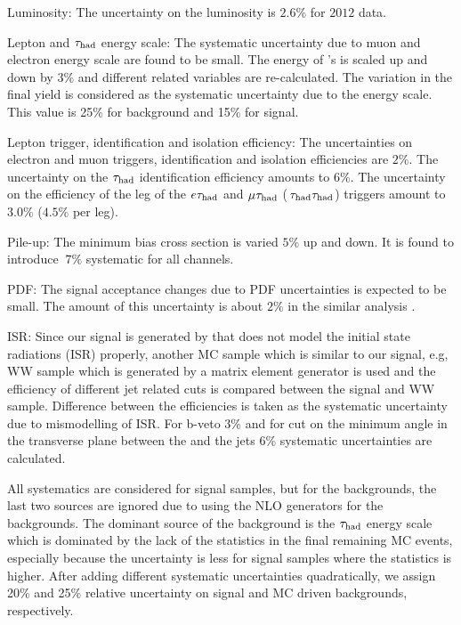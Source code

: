  Luminosity: The uncertainty on the luminosity  is $2.6\%$ for $2012$ data.
 
 Lepton and $\tau_{\rm had}$ energy scale: The systematic uncertainty due to muon and electron energy scale are found to be small.
The energy of \hadtau's is scaled up and down by $3\%$ and different \Tau related variables are re-calculated.  The variation in the final yield is considered as the
systematic uncertainty due to the \Tau energy scale. This value is 25\% for background and 15\% for signal.

 Lepton trigger, identification and isolation efficiency: The uncertainties on electron and muon triggers, identification and isolation efficiencies are $2\%$. 
The uncertainty on the $\tau_{\rm had}$ identification efficiency amounts to $6\%$. 
The uncertainty on the efficiency of the \Tau leg of the $e\tau_{\rm had}$ and $\mu\tau_{\rm had}$ ($\,\tau_{\rm had}\tau_{\rm had}$) triggers amount to $3.0\%$ ($4.5\%$ per leg).

 Pile-up: The minimum bias cross section is varied $5 \%$ up and down. It is found to introduce $~7 \%$ systematic for all channels.    

 PDF: The signal acceptance changes due to PDF uncertainties is expected to be small. 
The amount of this uncertainty is about $2\%$ in the similar analysis \cite{Khachatryan:2014qwa}.

ISR: Since our signal is generated by \PYTHIA that does not  model the initial state radiations (ISR) properly, another MC sample which is similar to our signal, e.g, WW sample 
which is generated by a matrix element generator is used and the efficiency of different jet related cuts is compared between the signal and WW sample. Difference between the
efficiencies is taken as the systematic uncertainty due to mismodelling of ISR. For b-veto 3\% and for cut on   the minimum angle in the transverse plane between 
the \MET and the jets 6\% systematic uncertainties are  calculated.  

All systematics are considered for signal samples, but for the backgrounds, the last two sources are ignored due to using the NLO generators 
for the backgrounds. The dominant source of the background is the $\tau_{\rm had}$ energy scale which is dominated by the lack of the statistics in the 
final remaining MC events, especially because the uncertainty is less for signal samples where the statistics is higher. 
After adding different systematic uncertainties quadratically, 
we assign 20\% and 25\% relative uncertainty on signal and MC driven backgrounds, respectively.

